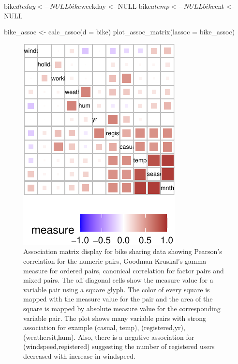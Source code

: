 \begin{Schunk}
\begin{Sinput}
bike$dteday <- NULL 
bike$weekday <- NULL
bike$atemp <- NULL
bike$cnt <- NULL

bike_assoc <- calc_assoc(d = bike)
plot_assoc_matrix(lassoc = bike_assoc)
\end{Sinput}
\begin{figure}

{\centering \includegraphics{rj_paper_files/figure-latex/assoc-matrix-bike-1} 

}

\caption[Association matrix display for bike sharing data showing Pearson's correlation for the numeric pairs, Goodman Kruskal's gamma measure for ordered pairs, canonical correlation for factor pairs and mixed pairs]{Association matrix display for bike sharing data showing Pearson's correlation for the numeric pairs, Goodman Kruskal's gamma measure for ordered pairs, canonical correlation for factor pairs and mixed pairs. The off diagonal cells show the measure value for a variable pair using a square glyph. The color of every square is mapped with the measure value for the pair and the area of the square is mapped by absolute measure value for the corresponding variable pair. The plot shows many variable pairs with strong association for example (casual, temp), (registered,yr), (weathersit,hum). Also, there is a negative association for (windspeed,registered) suggesting the number of registered users decreased with increase in windspeed.}\label{fig:assoc-matrix-bike}
\end{figure}
\end{Schunk}

